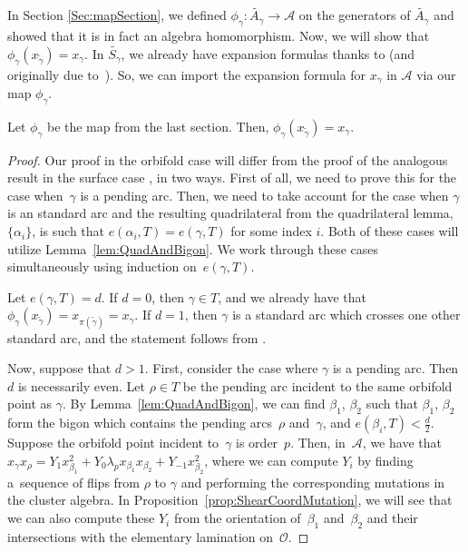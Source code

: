 In Section \ref{Sec:mapSection}, we defined $\phi_\gamma\colon \widetilde{A_\gamma} \to \mathcal{A}$ on the generators of $\widetilde{A_\gamma}$ and showed that it is in fact an algebra homomorphism. Now, we will show that $\phi_\gamma(x_{\widetilde{\gamma}}) = x_\gamma$. In $\widetilde{S_\gamma}$, we already have expansion formulas thanks to \cite{MSW} (and originally due to~\cite{Musiker-Schiffler}). So, we can import the expansion formula for $x_\gamma$ in $\mathcal{A}$ via our map $\phi_\gamma$.

\begin{Proposition}\label{Proposition5}
Let $\phi_\gamma$ be the map from the last section. Then, $\phi_\gamma(x_{\widetilde{\gamma}}) = x_\gamma$.
\end{Proposition}

\begin{proof}Our proof in the orbifold case will differ from the proof of the analogous result in the surface case \cite[Theorem~10.1]{MSW}, in two ways. First of all, we need to prove this for the case when~$\gamma$ is a pending arc. Then, we need to take account for the case when $\gamma$ is an standard arc and the resulting quadrilateral from the quadrilateral lemma, $\{\alpha_i\}$, is such that $e(\alpha_i,T) = e(\gamma,T)$ for some index $i$. Both of these cases will utilize Lemma~\ref{lem:QuadAndBigon}. We work through these cases simultaneously using induction on~$e(\gamma,T)$.

Let $e(\gamma,T) = d$. If $d = 0$, then $\gamma \in T$, and we already have that $\phi_\gamma(x_{\widetilde{\gamma}}) = x_{\pi(\widetilde{\gamma})} = x_\gamma$. If $d = 1$, then $\gamma$ is a standard arc which crosses one other standard arc, and the statement follows from \cite[Theorem~10.1]{MSW}.

Now, suppose that $d>1$. First, consider the case where $\gamma$ is a pending arc. Then $d$ is necessarily even. Let $\rho \in T$ be the pending arc incident to the same orbifold point as $\gamma$. By Lemma~\ref{lem:QuadAndBigon}, we can find $\beta_1$, $\beta_2$ such that $\beta_1$, $\beta_2$ form the bigon which contains the pending arcs~$\rho$ and~$\gamma$, and $e(\beta_i, T) < \frac{d}{2}$. Suppose the orbifold point incident to~$\gamma$ is order~$p$. Then, in~$\mathcal{A}$, we have that $x_\gamma x_\rho = Y_1 x_{\beta_1}^2 + Y_0 \lambda_p x_{\beta_1} x_{\beta_2} + Y_{-1} x_{\beta_2}^2$, where we can compute $Y_i$ by finding a~sequence of flips from $\rho$ to $\gamma$ and performing the corresponding mutations in the cluster algebra. In Proposition~\ref{prop:ShearCoordMutation}, we will see that we can also compute these $Y_i$ from the orientation of~$\beta_1$ and~$ \beta_2$ and their intersections with the elementary lamination on~$\mathcal{O}$.


\end{proof}
